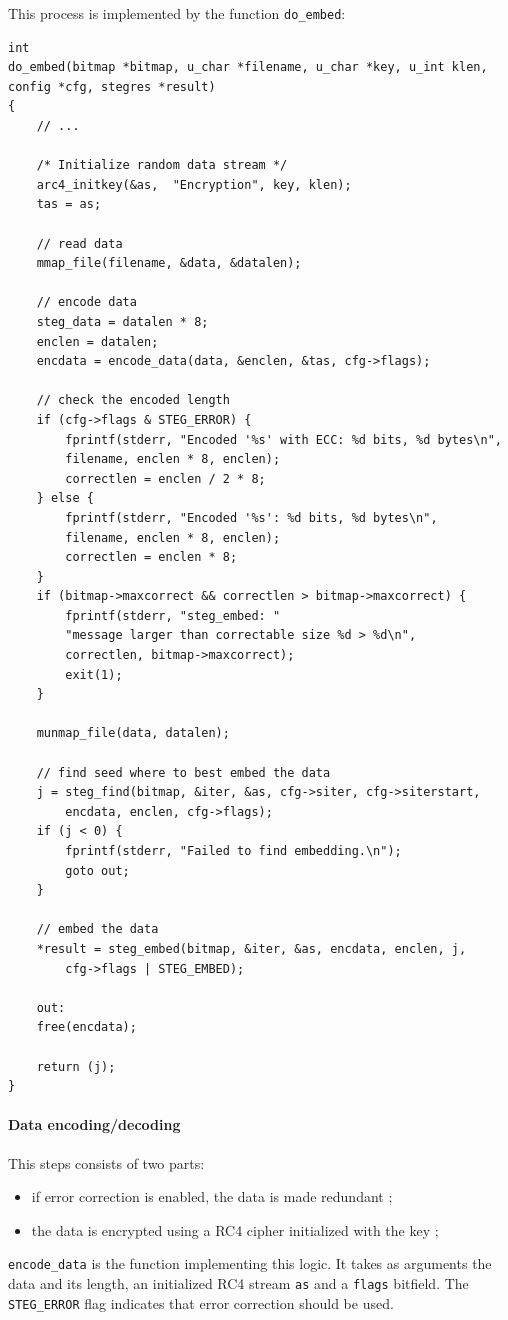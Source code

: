 \documentclass{article}
\begin{document}
This process is implemented by the function \texttt{do\_embed}:
\begin{verbatim}
int
do_embed(bitmap *bitmap, u_char *filename, u_char *key, u_int klen,
config *cfg, stegres *result)
{
	// ...

	/* Initialize random data stream */
	arc4_initkey(&as,  "Encryption", key, klen);
	tas = as;
	
	// read data
	mmap_file(filename, &data, &datalen);

	// encode data
	steg_data = datalen * 8;
	enclen = datalen;
	encdata = encode_data(data, &enclen, &tas, cfg->flags);

	// check the encoded length
	if (cfg->flags & STEG_ERROR) {
		fprintf(stderr, "Encoded '%s' with ECC: %d bits, %d bytes\n",
		filename, enclen * 8, enclen);
		correctlen = enclen / 2 * 8;
	} else {
		fprintf(stderr, "Encoded '%s': %d bits, %d bytes\n",
		filename, enclen * 8, enclen);
		correctlen = enclen * 8;
	}
	if (bitmap->maxcorrect && correctlen > bitmap->maxcorrect) {
		fprintf(stderr, "steg_embed: "
		"message larger than correctable size %d > %d\n",
		correctlen, bitmap->maxcorrect);
		exit(1);
	}
	
	munmap_file(data, datalen);
	
	// find seed where to best embed the data
	j = steg_find(bitmap, &iter, &as, cfg->siter, cfg->siterstart,
		encdata, enclen, cfg->flags);
	if (j < 0) {
		fprintf(stderr, "Failed to find embedding.\n");
		goto out;
	}
	
	// embed the data
	*result = steg_embed(bitmap, &iter, &as, encdata, enclen, j,
		cfg->flags | STEG_EMBED);
	
    out:
	free(encdata);

	return (j);
}
\end{verbatim}

\paragraph{Data encoding/decoding} This steps consists of two parts: 
\begin{itemize}
	\item if error correction is enabled, the data is made redundant ;
	\item the data is encrypted using a RC4 cipher initialized with the key ;
\end{itemize}

\texttt{encode\_data} is the function implementing this logic. It takes as arguments the data and its length, an initialized RC4 stream \texttt{as} and a \texttt{flags} bitfield. The \texttt{STEG\_ERROR} flag indicates that error correction should be used. \\
\end{document}
